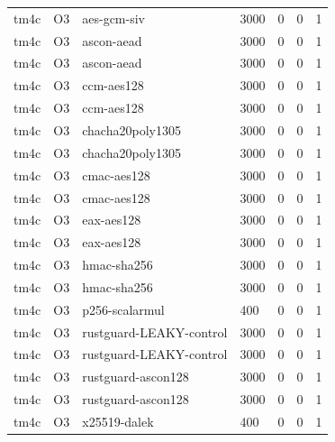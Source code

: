 \begin{table}[t]
\begin{tabular}{lllllll}
    tm4c & O3 & aes-gcm-siv & 3000 & 0 & 0 & 1 \\
    tm4c & O3 & ascon-aead & 3000 & 0 & 0 & 1 \\
    tm4c & O3 & ascon-aead & 3000 & 0 & 0 & 1 \\
    tm4c & O3 & ccm-aes128 & 3000 & 0 & 0 & 1 \\
    tm4c & O3 & ccm-aes128 & 3000 & 0 & 0 & 1 \\
    tm4c & O3 & chacha20poly1305 & 3000 & 0 & 0 & 1 \\
    tm4c & O3 & chacha20poly1305 & 3000 & 0 & 0 & 1 \\
    tm4c & O3 & cmac-aes128 & 3000 & 0 & 0 & 1 \\
    tm4c & O3 & cmac-aes128 & 3000 & 0 & 0 & 1 \\
    tm4c & O3 & eax-aes128 & 3000 & 0 & 0 & 1 \\
    tm4c & O3 & eax-aes128 & 3000 & 0 & 0 & 1 \\
    tm4c & O3 & hmac-sha256 & 3000 & 0 & 0 & 1 \\
    tm4c & O3 & hmac-sha256 & 3000 & 0 & 0 & 1 \\
    tm4c & O3 & p256-scalarmul & 400 & 0 & 0 & 1 \\
    tm4c & O3 & rustguard-LEAKY-control & 3000 & 0 & 0 & 1 \\
    tm4c & O3 & rustguard-LEAKY-control & 3000 & 0 & 0 & 1 \\
    tm4c & O3 & rustguard-ascon128 & 3000 & 0 & 0 & 1 \\
    tm4c & O3 & rustguard-ascon128 & 3000 & 0 & 0 & 1 \\
    tm4c & O3 & x25519-dalek & 400 & 0 & 0 & 1 \\
    \bottomrule
  \end{tabular}
\end{table}
